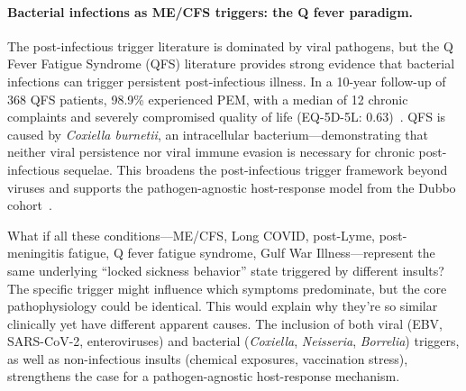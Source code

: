 \paragraph{Bacterial infections as ME/CFS triggers: the Q fever paradigm.}
The post-infectious trigger literature is dominated by viral pathogens, but the Q Fever Fatigue Syndrome (QFS) literature provides strong evidence that bacterial infections can trigger persistent post-infectious illness. In a 10-year follow-up of 368 QFS patients, 98.9\% experienced PEM, with a median of 12 chronic complaints and severely compromised quality of life (EQ-5D-5L: 0.63)~\cite{Spronk2023qfever}. QFS is caused by \textit{Coxiella burnetii}, an intracellular bacterium---demonstrating that neither viral persistence nor viral immune evasion is necessary for chronic post-infectious sequelae. This broadens the post-infectious trigger framework beyond viruses and supports the pathogen-agnostic host-response model from the Dubbo cohort~\cite{Hickie2006postinfectious}.

\begin{open_question}
What if all these conditions---ME/CFS, Long COVID, post-Lyme, post-meningitis fatigue, Q fever fatigue syndrome, Gulf War Illness---represent the same underlying ``locked sickness behavior'' state triggered by different insults? The specific trigger might influence which symptoms predominate, but the core pathophysiology could be identical. This would explain why they're so similar clinically yet have different apparent causes. The inclusion of both viral (EBV, SARS-CoV-2, enteroviruses) and bacterial (\textit{Coxiella}, \textit{Neisseria}, \textit{Borrelia}) triggers, as well as non-infectious insults (chemical exposures, vaccination stress), strengthens the case for a pathogen-agnostic host-response mechanism.
\end{open_question}

